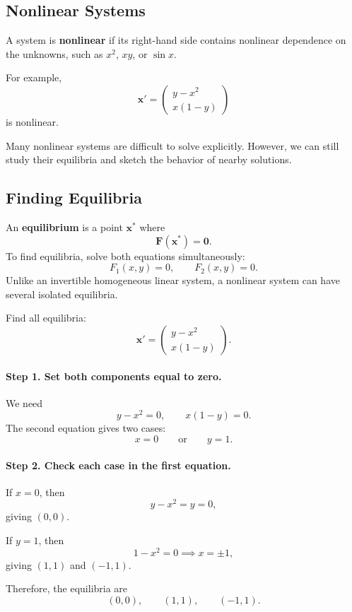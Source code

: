 \documentclass[10pt,letterpaper]{article}
\begin{document}
\subsection{Nonlinear Systems}

A system is \textbf{nonlinear} if its right-hand side
contains nonlinear dependence on the unknowns, such as
$x^2$, $xy$, or $\sin x$.

For example,
\[
\mathbf{x}'=
\begin{pmatrix}
y-x^2\\
x(1-y)
\end{pmatrix}
\]
is nonlinear.

Many nonlinear systems are difficult to solve explicitly.
However, we can still study their equilibria and sketch
the behavior of nearby solutions.

\subsection{Finding Equilibria}

An \textbf{equilibrium} is a point $\mathbf{x}^*$ where
\[
\mathbf{F}(\mathbf{x}^*)=\mathbf{0}.
\]
To find equilibria, solve both equations simultaneously:
\[
F_1(x,y)=0,\qquad F_2(x,y)=0.
\]
Unlike an invertible homogeneous linear system,
a nonlinear system can have several isolated equilibria.

\begin{example}[2]{
Find all equilibria:
\[
\mathbf{x}'=
\begin{pmatrix}
y-x^2\\
x(1-y)
\end{pmatrix}.
\]
}

\paragraph{Step 1. Set both components equal to zero.}
We need
\[
y-x^2=0,
\qquad
x(1-y)=0.
\]
The second equation gives two cases:
\[
x=0\qquad\text{or}\qquad y=1.
\]

\paragraph{Step 2. Check each case in the first equation.}
If $x=0$, then
\[
y-x^2=y=0,
\]
giving $(0,0)$.

If $y=1$, then
\[
1-x^2=0
\implies x=\pm1,
\]
giving $(1,1)$ and $(-1,1)$.

Therefore, the equilibria are
\[
\boxed{(0,0),\qquad (1,1),\qquad (-1,1).}
\]
\end{example}
\end{document}
